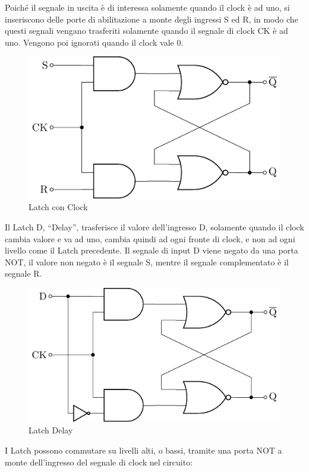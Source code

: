 \documentclass{article}
\numberwithin{equation}{subsection}
\begin{document}
Poiché il segnale in uscita è di interessa solamente quando il clock è ad uno, si inseriscono delle porte di abilitazione a monte degli ingressi S ed R, in modo che questi segnali vengano trasferiti solamente 
quando il segnale di clock CK è ad uno. Vengono poi ignorati quando il clock vale 0. 

\begin{figure}[H]%
    \centering%
    \includegraphics{latch-ck.pdf}%
    \caption{Latch con Clock}%
\end{figure}

Il Latch D, ``Delay'', trasferisce il valore dell'ingresso D, solamente quando il clock cambia valore e va ad uno, cambia quindi ad ogni fronte di clock, e non ad ogni livello come il Latch precedente. 
Il segnale di input D viene negato da una porta NOT, il valore non negato è il segnale S, mentre il segnale complementato è il segnale R. 

\begin{figure}[H]%
    \centering%
    \includegraphics{latch-d.pdf}%
    \caption{Latch Delay}%
\end{figure}

I Latch possono commutare su livelli alti, o bassi, tramite una porta NOT a monte dell'ingresso del segnale di clock nel circuito:
\end{document}
